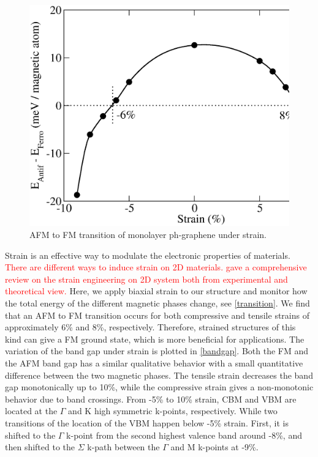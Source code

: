 \begin{figure}[htbp]
\centering
\includegraphics[width=\linewidth]{FM_AFM.eps}%
\caption{AFM to FM transition of monolayer ph-graphene under strain. \label{transition}}
\end{figure}

Strain is an effective way to modulate the electronic properties of materials. \textcolor{red}{There are different ways to induce strain on 2D materials. \citet{Roldan2015} gave a comprehensive review on the strain engineering on 2D system both from experimental and theoretical view. }Here, we apply biaxial strain to our structure and monitor how the total energy of the different magnetic phases change, see \autoref{transition}. We find that an AFM to FM transition occurs for both compressive and tensile strains of approximately 6\% and 8\%, respectively. Therefore, strained structures of this kind can give a FM ground state, which is more beneficial for applications. The variation of the band gap under strain is plotted in \autoref{bandgap}. Both the FM and the AFM band gap has a similar qualitative behavior with a small quantitative difference between the two magnetic phases. The tensile strain decreases the band gap monotonically up to 10\%, while the compressive strain gives a non-monotonic behavior due to band crossings. From -5\% to 10\% strain, CBM and VBM are located at the $\Gamma$ and K high symmetric k-points, respectively. While two transitions of the location of the VBM happen below -5\% strain. First, it is shifted to the $\Gamma$ k-point from the second highest valence band around -8\%, and then shifted to the $\Sigma$ k-path between the $\Gamma$ and M k-points at -9\%.

